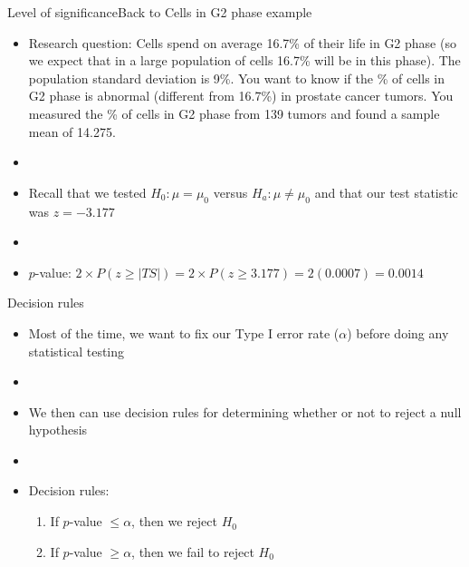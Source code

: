 \documentclass[xcolor=dvipsnames]{beamer}
\begin{document}
\begin{frame}{Level of significance}{Back to Cells in G2 phase example}
		\begin{itemize}
		\item Research question: Cells spend on average 16.7\% of their life in G2 phase (so we expect that in a large population of cells 16.7\% will be in this phase). The population standard deviation is 9\%. You want to know if the \% of cells in G2 phase is abnormal (different from 16.7\%) in prostate cancer tumors. You measured the \% of cells in G2 phase from 139 tumors and found a sample mean of 14.275.
		
		\item[]
		
		\item Recall that we tested $H_0: \mu = \mu_0$ versus $H_a: \mu \neq \mu_0$ and that our test statistic was $z = -3.177$ 
		
		\item[]
		
		\item $p$-value: $2\times P(z \geq |TS|) = 2 \times P(z \geq 3.177) = 2 (0.0007) = 0.0014$ 
	\end{itemize}
\end{frame}

\begin{frame}{Decision rules}
	\begin{itemize}
		\item Most of the time, we want to fix our Type I error rate ($\alpha$) before doing any statistical testing
		
		\item[]
		
		\item We then can use decision rules for determining whether or not to reject a null hypothesis
		
		\item[]
		
		\item Decision rules:
		\begin{enumerate}
			\item If $p$-value $\leq \alpha$, then we reject $H_0$
			\item If $p$-value $\geq \alpha$, then we fail to reject $H_0$
		\end{enumerate}
	\end{itemize}
\end{frame}
\end{document}
